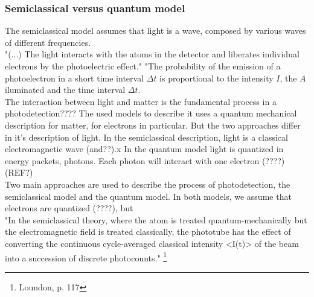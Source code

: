 \begin{bibunit}[plain]
\subsubsection{Semiclassical versus quantum model}



The semiclassical model assumes that light is a wave, composed by various waves of different frequencies.\\


"(...) The light interacts with the atoms in the detector and liberates individual electrons by the photoelectric effect."
"The probability of the emission of a photoelectron in a short time interval $\Delta t$ is proportional to the intensity $I$, the $A$ iluminated and the time interval $\Delta t$.\\




The interaction between light and matter is the fundamental process in a photodetection???? The used models to describe it uses a quantum mechanical description for matter, for electrons in particular. But the two approaches differ in it's description of light. In the semiclassical description, light is a classical electromagnetic wave (and??).x
In the quantum model light is quantized in energy packets, photons. Each photon will interact with one electron (????)\\
(REF?)\\

Two main approaches are used to describe the process of photodetection, the semiclassical model and the quantum model. In both models, we assume that electrons are quantized (????), but 
\\

"In the semiclassical theory, where the atom is treated quantum-mechanically but the electromagnetic field is treated classically, the phototube has the effect of converting the continuous cycle-averaged classical intensity <I(t)> of the beam into a succession of discrete photocounts."
\footnote{Loundon, p. 117}\\



\end{bibunit}
